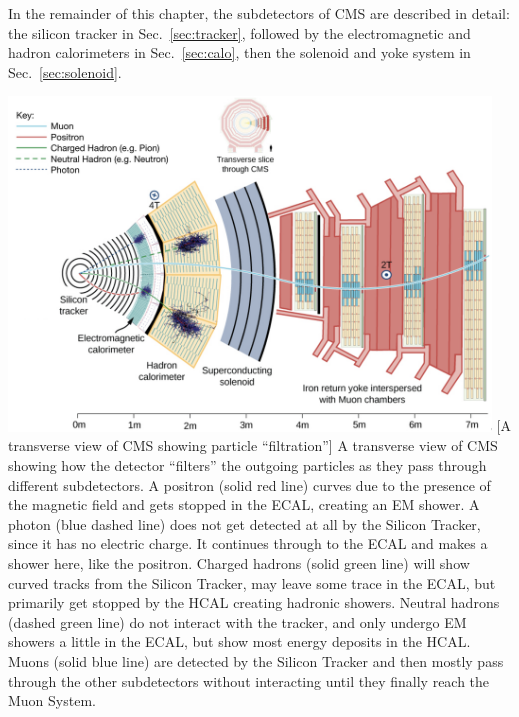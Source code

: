 In the remainder of this chapter, the subdetectors of CMS are described in detail:
the silicon tracker in Sec.~\ref{sec:tracker},
followed by the electromagnetic and hadron calorimeters in Sec.~\ref{sec:calo},
then the solenoid and yoke system in Sec.~\ref{sec:solenoid}.
\begin{multiFigure}
    \centering
    \includegraphics[width=0.96\textwidth,keepaspectratio]{figures/cms/cms_transverse_particletrajectories_corrected.png}
        [A transverse view of CMS showing particle ``filtration'']
        {
        A transverse view of CMS showing how the detector ``filters'' the outgoing particles as they pass through different subdetectors.
        A positron (solid red line) curves due to the presence of the magnetic field and gets stopped in the ECAL, creating an EM shower.
        A photon (blue dashed line) does not get detected at all by the Silicon Tracker, since it has no electric charge.
        It continues through to the ECAL and makes a shower here, like the positron.
        Charged hadrons (solid green line) will show curved tracks from the Silicon Tracker, may leave some trace in the ECAL, but primarily get stopped by the HCAL creating hadronic showers.
        Neutral hadrons (dashed green line) do not interact with the tracker, and only undergo EM showers a little in the ECAL, but show most energy deposits in the HCAL.
        Muons (solid blue line) are detected by the Silicon Tracker and then mostly pass through the other subdetectors without interacting until they finally reach the Muon System.
}
\end{multiFigure}
